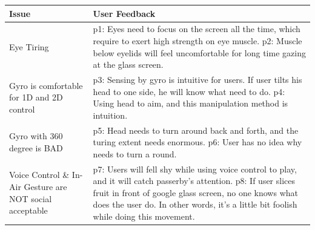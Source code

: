 
\begin{table}[!h]
\newcommand{\tabincell}[2]{\begin{tabular}{@{}#1@{}}#2\end{tabular}}
   \centering
   \begin{tabular}{|p{}|p{}|}
     \hline
     \multicolumn{1}{|p{0.3\columnwidth}|}{Issue} &
     \multicolumn{1}{|p{0.5\columnwidth}|}{User Feedback} \\
     \hline
     \multicolumn{1}{|p{0.3\columnwidth}|}{Eye Tiring} & 
     \multicolumn{1}{|p{0.5\columnwidth}|}{p1: Eyes need to focus on the screen all the time, which require to exert high strength on eye muscle. p2: Muscle below eyelids will feel uncomfortable for long time gazing at the glass screen.} \\
     \hline
     \multicolumn{1}{|p{0.3\columnwidth}|}{Gyro is comfortable for 1D and 2D control } & 
     \multicolumn{1}{|p{0.5\columnwidth}|}{p3: Sensing by gyro is intuitive for users. If user tilts his head to one side, he will know what need to do. p4: Using head to aim, and this manipulation method is intuition.} \\
     \hline
     \multicolumn{1}{|p{0.3\columnwidth}|}{Gyro with 360 degree is BAD} & 
     \multicolumn{1}{|p{0.5\columnwidth}|}{p5: Head needs to turn around back and forth, and the turing extent needs enormous. p6: User has no idea why needs to turn a round.} \\
     \hline
     \multicolumn{1}{|p{0.3\columnwidth}|}{Voice Control \& In-Air Gesture are NOT social acceptable} & 
     \multicolumn{1}{|p{0.5\columnwidth}|}{p7: Users will fell shy while using voice control to play, and it will catch passerby's attention. p8: If user slices fruit in front of google glass screen, no one knows what does the user do. In other words, it's a little bit foolish while doing this movement.} \\

\end{tabular}
\end{table}

